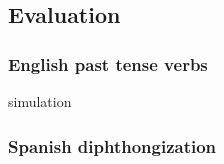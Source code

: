 \subsection{Evaluation}

\citet{Chan2008}

\subsubsection{English past tense verbs}

\citet{CELEX}

simulation

\subsubsection{Spanish diphthongization}
